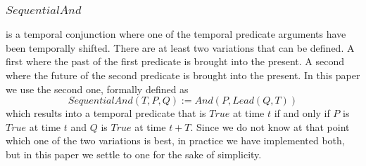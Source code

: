 \documentclass[runningheads]{llncs}
\newcommand{\SP}{\;\;\;}
\newcommand{\TTrue}{\textit{True}}
\newcommand{\TAnd}{\textit{And}}
\newcommand{\TSeqAnd}{\textit{SequentialAnd}}
\newcommand{\TBSeqAnd}{\textit{BackSequentialAnd}}
\newcommand{\TFSeqAnd}{\textit{ForeSequentialAnd}}
\newcommand{\TLag}{\textit{Lag}}
\newcommand{\TLead}{\textit{Lead}}
\begin{document}
\subsubsection{$\TSeqAnd$} is a temporal conjunction where one of the
temporal predicate arguments have been temporally shifted.  There are
at least two variations that can be defined.  A first where the past
of the first predicate is brought into the present.  A second where
the future of the second predicate is brought into the present.  In
this paper we use the second one, formally defined as
$$\TSeqAnd(T, P, Q) := \TAnd(P, \TLead(Q, T))$$
which results into a temporal predicate that is $\TTrue$ at time $t$
if and only if $P$ is $\TTrue$ at time $t$ and $Q$ is $\TTrue$ at time
$t+T$.  Since we do not know at that point which one of the two
variations is best, in practice we have implemented both, but in this
paper we settle to one for the sake of simplicity.

\end{document}
